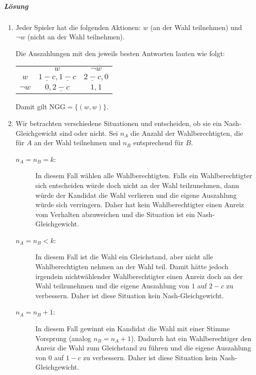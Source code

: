 \subparagraph{Lösung}%

\begin{enumerate}
  \item Jeder Spieler hat die folgenden Aktionen:
    $w$ (an der Wahl teilnehmen) und $\neg w$ (nicht an der Wahl teilnehmen).

    Die Auszahlungen mit den jeweils besten Antworten lauten wie folgt:
    \begin{center}
      \begin{tabular}{ccc}
        & $w$ & $\neg w$\\
        \cmidrule{2-3}
        $w$ & $\underline{1-c},\underline{1-c}$ & $\underline{2-c},0$\\
        \cmidrule{2-3}
        $\neg w$ & $0,\underline{2-c}$ & $1,1$\\
        \cmidrule{2-3}
      \end{tabular}
    \end{center}
    Damit gilt $\text{NGG} = \{(w,w)\}$.

  \item Wir betrachten verschiedene Situationen und entscheiden, ob sie ein
    Nash-Gleichgewicht sind oder nicht.
    Sei $n_A$ die Anzahl der Wahlberechtigten, die für $A$ an der Wahl teilnehmen und
    $n_B$ entsprechend für $B$.

    \begin{description}
      \item[$n_A = n_B = k$:] In diesem Fall wählen alle Wahlberechtigten.
        Falls ein Wahlberechtigter sich entscheiden würde doch nicht an der Wahl
        teilzunehmen, dann würde der Kandidat die Wahl verlieren und die eigene Auszahlung
        würde sich verringern.
        Daher hat kein Wahlberechtigter einen Anreiz vom Verhalten abzuweichen und die
        Situation ist ein Nash-Gleichgewicht.

      \item[$n_A = n_B < k$:] In diesem Fall ist die Wahl ein Gleichstand, aber nicht alle
        Wahlberechtigten nehmen an der Wahl teil.
        Damit hätte jedoch irgendein nichtwählender Wahlberechtigter einen Anreiz doch an
        der Wahl teilzunehmen und die eigene Auszahlung von $1$ auf $2-c$ zu verbessern.
        Daher ist diese Situation kein Nash-Gleichgewicht.

      \item[$n_A = n_B + 1$:] In diesem Fall gewinnt ein Kandidat die Wahl mit einer
        Stimme Vorsprung (analog $n_B = n_A + 1$).
        Dadurch hat ein Wahlberechtiger den Anreiz die Wahl zum Gleichstand zu führen und
        die eigene Auszahlung von $0$ auf $1-c$ zu verbessern.
        Daher ist diese Situation kein Nash-Gleichgewicht.


\end{description}
\end{enumerate}
